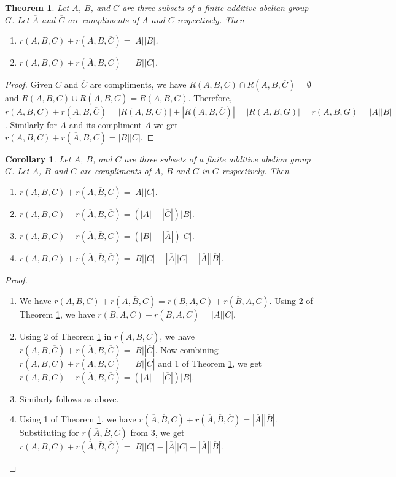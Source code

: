 \documentclass[12pt,a4paper]{article}
\newtheorem{thm}{Theorem}[section]
\newtheorem{cor}{Corollary}[section]
\begin{document}
	\begin{thm}\label{comp in 3}
		Let $A$, $B$, and $C$ are three subsets of a finite additive abelian group $G$. Let $\overline{A}$ and $\overline{C}$ are compliments of $A$ and $C$ respectively. Then
		\begin{enumerate}
			\item $r(A,B,C)+r(A,B,\overline{C})=|A||B|$.
			\item $r(A,B,C)+r(\overline{A},B,C)=|B||C|$.
		\end{enumerate}
	\end{thm}
	\begin{proof}
		Given $C$  and $\overline{C}$ are compliments, we have $R(A,B,C)\cap R(A,B,\overline{C})=\emptyset$ and $R(A,B,C)\cup R(A,B,\overline{C})=R(A,B,G)$. Therefore, $r(A,B,C)+r(A,B,\overline{C})=|R(A,B,C)|+|R(A,B,\overline{C})|=|R(A,B,G)|=r(A,B,G) =|A||B|$. Similarly for $A$ and its compliment $\overline{A}$ we get $r(A,B,C)+r(\overline{A},B,C)=|B||C|$.
	\end{proof}
	\begin{cor}\label{cor comp 3}
		Let $A$, $B$, and $C$ are three subsets of a finite additive abelian group $G$. Let $\overline{A}$, $\overline{B}$ and $\overline{C}$ are compliments of $A$, $B$ and $C$ in $G$ respectively. Then
		\begin{enumerate}
			\item $r(A,B,C)+r(A,\overline{B},C)=|A||C|$.
			\item $r(A,B,C)-r(\overline{A},B,\overline{C})=(|A|-|\overline{C}|)|B|$.
			\item $r(A,B,C)-r(\overline{A},\overline{B},C)=(|B|-|\overline{A}|)|C|$.
			\item $r(A,B,C)+r(\overline{A},\overline{B},\overline{C})=|B||C|-|\overline{A}||C|+|\overline{A}||\overline{B}|$.
			
		\end{enumerate}
	\end{cor}
	\begin{proof}
		\begin{enumerate}
			\item We have  $r(A,B,C)+r(A,\overline{B},C)=r(B,A,C)+r(\overline{B},A,C)$. Using 2 of Theorem \ref{comp in 3}, we have $r(B,A,C)+r(\overline{B},A,C)=|A||C|$.
			\item Using 2 of Theorem \ref{comp in 3} in $r(A,B,\overline{C})$, we have $r(A,B,\overline{C})+r(\overline{A},B,\overline{C})=|B||\overline{C}|$. Now combining $r(A,B,\overline{C})+r(\overline{A},B,\overline{C})=|B||\overline{C}|$ and 1 of Theorem \ref{comp in 3}, we get $r(A,B,C)-r(\overline{A},B,\overline{C})=(|A|-|\overline{C}|)|B|$.
			\item Similarly follows as above.
			\item Using 1 of Theorem \ref{comp in 3}, we have $r(\overline{A},\overline{B},C)+r(\overline{A},\overline{B},\overline{C})=|\overline{A}||\overline{B}|$. Substituting for $r(\overline{A},\overline{B},C)$ from 3, we get $r(A,B,C)+r(\overline{A},\overline{B},\overline{C})=|B||C|-|\overline{A}||C|+|\overline{A}||\overline{B}|$.
		\end{enumerate}
	\end{proof}
\end{document}
